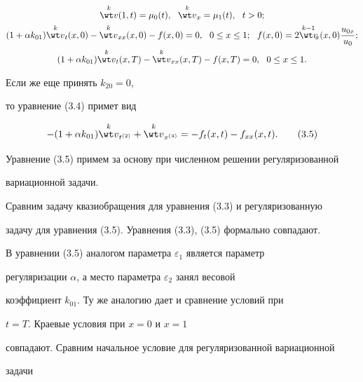 \begin{pf}
\begin{gather}
% 


\up{k}{\wt v}(1,t)=\mu_0(t),\ \ \up{k}{\wt v}_x=\mu_1(t), 


\ \ t>0; \notag \\ 


% 


(1+\alpha k_{01})\up{k}{\wt v}_t(x,0)- 


\up{k}{\wt v}_{xx}(x,0)-f(x,0)=0,\ \ 0\le x\le 1; 


\ \ f(x,0)=2\up{k-1}{\wt v}_{\!\!x}(x,0)\frac{u_{0x}}{u_0};\notag\\ 


%


(1+\alpha k_{01})\up{k}{\wt v}_t(x,T)-\up{k}{\wt v}_{xx} 


(x,T)-f(x,T)=0,\ \ 0\le x\le1.\notag 


\end{gather} 


Если же еще принять $k_{20}=0$, 


то уравнение (3.4) примет вид 


\begin{equation} 


-(1+\alpha k_{01})\up{k}{\wt v}_{t^{(2)}} 


+\up{k}{\wt v}_{x^{(4)}}=-f_t(x,t)-f_{xx}(x,t).\tag{3.5} 


\end{equation} 


Уравнение (3.5) примем за основу при численном решении регуляризованной 


вариационной задачи. 


 


Сравним задачу квазиобращения для уравнения (3.3) и регуляризованную 


задачу для уравнения (3.5). Уравнения (3.3), (3.5) формально совпадают. 


В уравнении (3.5) аналогом параметра $\varepsilon_1$ является параметр 


регуляризации $\alpha$, а место параметра $\varepsilon_2$ занял весовой 


коэффициент $k_{01}$. Ту же аналогию дает и сравнение условий при 


$t=T$. Краевые условия при $x=0$ и $x=1$ 


совпадают. Сравним начальное условие для регуляризованной вариационной 


задачи 


\begin{equation} 



\end{equation}
\end{pf}
